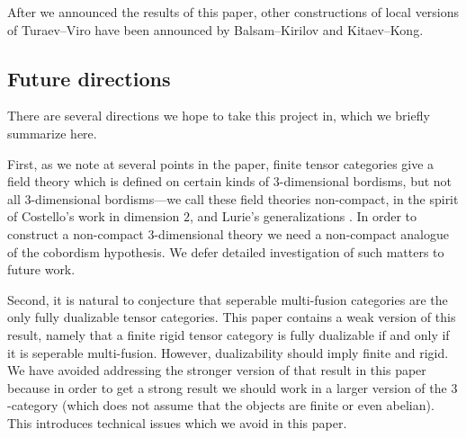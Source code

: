 \documentclass{amsart}
\begin{document}
After we announced the results of this paper, other constructions of local versions of Turaev--Viro have been announced by Balsam--Kirilov and Kitaev--Kong.  

\subsection{Future directions}

There are several directions we hope to take this project in, which we briefly summarize here.

First, as we note at several points in the paper, finite tensor categories give a field theory which is defined on certain kinds of $3$-dimensional bordisms, but not all $3$-dimensional bordisms---we call these field theories non-compact, in the spirit of Costello's work \cite{MR2298823} in dimension $2$, and Lurie's generalizations \cite[\S 4.2]{lurie-ch}.  In order to construct a non-compact $3$-dimensional theory we need a non-compact analogue of the cobordism hypothesis.  We defer detailed investigation of such matters to future work.

Second, it is natural to conjecture that seperable multi-fusion categories are the only fully dualizable tensor categories.  This paper contains a weak version of this result, namely that a finite rigid tensor category is fully dualizable if and only if it is seperable multi-fusion.  However, dualizability should imply finite and rigid.  We have avoided addressing the stronger version of that result in this paper because in order to get a strong result we should work in a larger version of the $3$-category (which does not assume that the objects are finite or even abelian).  This introduces technical issues which we avoid in this paper.
\end{document}
